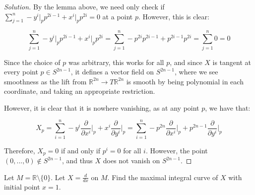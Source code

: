 \documentclass[10pt]{article}
\newenvironment{problem}[2][]{\begin{trivlist}
\item[\hskip \labelsep {\bfseries #1}\hskip \labelsep {\bfseries #2.}]}{\end{trivlist}}
\begin{document}
\begin{proof}[Solution]
By the lemma above, we need only check if $\sum_{j=1}^{n} -y^i\big|_p p^{2i-1} + x^i\big|_p p^{2i} = 0$ at a point $p$. However, this is clear:

$$\sum_{j=1}^{n} -y^i\big|_p p^{2i-1} + x^i\big|_p p^{2i} =\sum_{j=1}^{n} -p^{2i} p^{2i-1} + p^{2i-1} p^{2i} = \sum_{j=1}^n 0 = 0$$

Since the choice of $p$ was arbitrary, this works for all $p$, and since $X$ is tangent at every point $p\in S^{2n-1}$, it defines a vector field on $S^{2n-1}$, where we see smoothness as the lift from $\mathbb{R}^{2n} \to T\mathbb{R}^{2n}$ is smooth by being polynomial in each coordinate, and taking an appropriate restriction.

However, it is clear that it is nowhere vanishing, as at any point $p$, we have that:

$$X_p = \sum_{i=1}^n -y^i \frac{\partial}{\partial x^i}\bigg|_p + x^i \frac{\partial}{\partial y^i}\bigg|_p = \sum_{i=1}^n -p^{2n} \frac{\partial}{\partial x^i}\bigg|_p + p^{2n-1} \frac{\partial}{\partial y^i}\bigg|_p$$

Therefore, $X_p = 0$ if and only if $p^i = 0$ for all $i$. However, the point $(0,...,0) \not \in S^{2n-1}$, and thus $X$ does not vanish on $S^{2n-1}$.

\end{proof}

\begin{problem}{Question 4}

Let $M = \mathbb{R} \setminus \{ 0 \}$. Let $X = \frac{d}{dx}$ on $M$. Find the maximal integral curve of $X$ with initial point $x = 1$.


\end{problem}
\end{document}
